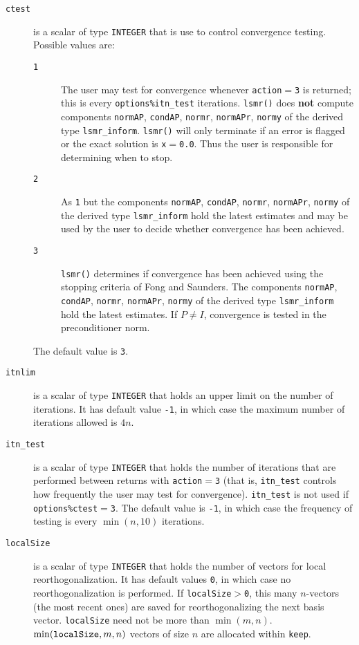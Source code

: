 \begin{description}
\item[\texttt{ctest}] is a scalar of type {\tt INTEGER} that is use to control
   convergence testing. Possible values are:
   \begin{description}
   \item[\texttt{1}] The user may test for convergence whenever 
      {\tt action}$ = ${\tt 3} is returned; this is
      every {\tt options\%itn\_test} iterations.
      {\tt lsmr()} does {\bf not} compute components
      {\tt normAP}, {\tt condAP}, {\tt normr}, {\tt normAPr}, {\tt normy}
      of the derived type {\tt lsmr\_inform}.
      {\tt lsmr()} will only terminate if an  error is flagged
      or the exact solution is {\tt x}$ = ${\tt 0.0}.
      Thus the user is responsible for determining when to stop.
   \item[\texttt{2}] As {\texttt 1} but the components
      {\tt normAP}, {\tt condAP}, {\tt normr}, {\tt normAPr}, {\tt normy}
      of the derived type {\tt lsmr\_inform} hold the latest estimates and
      may be used by the user to decide whether convergence has been achieved.
   \item[\texttt{3}] {\tt lsmr()} determines if convergence has been achieved
      using the stopping criteria of Fong and Saunders. The components
      {\tt normAP}, {\tt condAP}, {\tt normr}, {\tt normAPr}, {\tt normy}
      of the derived type {\tt lsmr\_inform} hold the latest estimates.
      If $P \neq I$,  convergence is tested in the
      preconditioner norm.
   \end{description}
   The default value is {\tt 3}.

   \item[\texttt{itnlim}] is a scalar of
      type {\tt INTEGER} that holds an upper limit on the number of iterations.
      It has default value {\tt -1}, in which case the 
      maximum number of iterations allowed is $4n$. 

   \item[\texttt{itn\_test}] is a scalar of
      type {\tt INTEGER} that holds the number of iterations that are performed
      between returns with {\tt action}$ = ${\tt 3} (that is, {\tt itn\_test}
      controls how frequently the user may test for convergence).
      {\tt itn\_test} is not used if {\tt options\%ctest}$=${\tt 3}.
      The default value is {\tt -1}, in which case the frequency of testing is 
      every $\min(n,10)$ iterations.

   \item[\texttt{localSize}] is a scalar of type {\tt INTEGER} that holds the
      number of vectors for local reorthogonalization. It has default values
      {\tt 0}, in which case no reorthogonalization is performed.
      If {\tt localSize}$>${\tt0}, this many $n$-vectors  (the most recent ones)
      are saved for reorthogonalizing the next basis vector. {\tt localSize}
      need not be more than $\min(m,n)$. $\min({\tt localSize},m,n)$ vectors of
      size $n$ are allocated within {\tt keep}.
\end{description}

